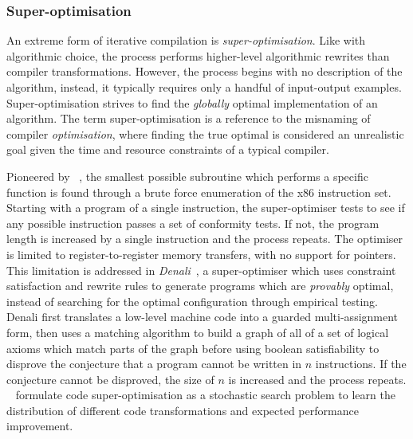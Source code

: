 \subsubsection{Super-optimisation}

An extreme form of iterative compilation is \emph{super-optimisation}. Like with algorithmic choice, the process performs higher-level algorithmic rewrites than compiler transformations. However, the process begins with no description of the algorithm, instead, it typically requires only a handful of input-output examples. Super-optimisation strives to find the \emph{globally} optimal implementation of an algorithm. The term super-optimisation is a reference to the misnaming of compiler \emph{optimisation}, where finding the true optimal is considered an unrealistic goal given the time and resource constraints of a typical compiler.

Pioneered by \citeauthor{Massalin1987}~\cite{Massalin1987}, the smallest possible subroutine which performs a specific function is found through a brute force enumeration of the x86 instruction set. Starting with a program of a single instruction, the super-optimiser tests to see if any possible instruction passes a set of conformity tests. If not, the program length is increased by a single instruction and the process repeats. The optimiser is limited to register-to-register memory transfers, with no support for pointers. This limitation is addressed in \emph{Denali}~\cite{Joshi2002}, a super-optimiser which uses constraint satisfaction and rewrite rules to generate programs which are \emph{provably} optimal, instead of searching for the optimal configuration through empirical testing. Denali first translates a low-level machine code into a guarded multi-assignment form, then uses a matching algorithm to build a graph of all of a set of logical axioms which match parts of the graph before using boolean satisfiability to disprove the conjecture that a program cannot be written in $n$ instructions. If the conjecture cannot be disproved, the size of $n$ is increased and the process repeats.
\citeauthor{Bunel2017a}~\cite{Bunel2017a} formulate code super-optimisation as a stochastic search problem to learn the distribution of different code transformations and expected performance improvement. %

